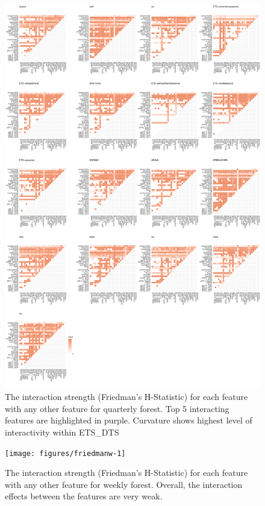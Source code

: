 \documentclass[11pt,a4paper,]{article}
\begin{document}
\begin{figure}
\centering
\includegraphics{figures/friedmanm-1.pdf}
\caption{\label{fig:friedmanm}The interaction strength (Friedman's H-Statistic) for each feature with any other feature for quarterly forest. Top 5 interacting features are highlighted in purple. Curvature shows highest level of interactivity within ETS\_DTS}
\end{figure}

\begin{figure}[h]

{\centering \texttt{[image: figures/friedmanw-1]} 

}

\caption{The interaction strength (Friedman's H-Statistic) for each feature with any other feature for weekly forest. Overall, the interaction effects between the features are very weak.}\label{fig:friedmanw}
\end{figure}
\end{document}
